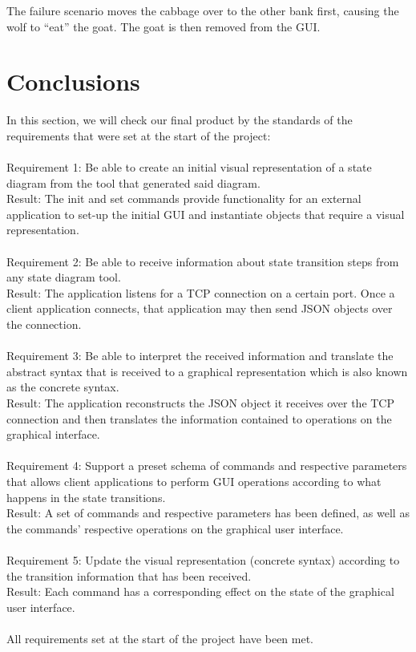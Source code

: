 \documentclass[11pt,a4paper]{article}
\begin{document}
The failure scenario moves the cabbage over to the other bank first, causing the wolf to ``eat'' the goat. The goat is then removed from the GUI.


\section{Conclusions}

In this section, we will check our final product by the standards of the requirements that were set at the start of the project:
\\\\
Requirement 1: Be able to create an initial visual representation of a state diagram from the tool that generated said diagram.\\
Result: The init and set commands provide functionality for an external application to set-up the initial GUI and instantiate objects that require a visual representation.
\\\\
Requirement 2: Be able to receive information about state transition steps from any state diagram tool.\\
Result: The application listens for a TCP connection on a certain port. Once a client application connects, that application may then send JSON objects over the connection.
\\\\
Requirement 3: Be able to interpret the received information and translate the abstract syntax that is received to a graphical representation which is also known as the concrete syntax.\\
Result: The application reconstructs the JSON object it receives over the TCP connection and then translates the information contained to operations on the graphical interface.
\\\\
Requirement 4: Support a preset schema of commands and respective parameters that allows client applications to perform GUI operations according to what happens in the state transitions.\\
Result: A set of commands and respective parameters has been defined, as well as the commands' respective operations on the graphical user interface.
\\\\
Requirement 5: Update the visual representation (concrete syntax) according to the transition information that has been received.\\
Result: Each command has a corresponding effect on the state of the graphical user interface.
\\\\
All requirements set at the start of the project have been met.
\end{document}
